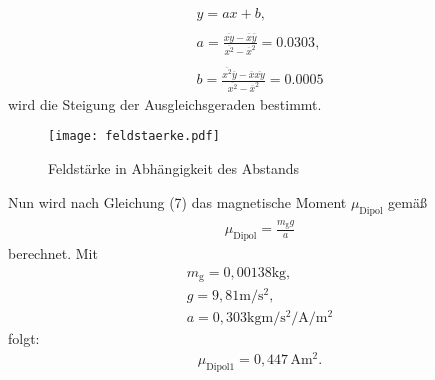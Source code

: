 \begin{gather*}
y = ax+b, \\~\\
a = \frac{\overline{xy}-\overline x\overline y}{\overline{x^2}-\overline{x}^2} = 0.0303,\\~\\
b = \frac{\overline{x^2}\overline{y}-\overline{x}\overline{xy}}{\overline{x^2}-\overline{x}^2} = 0.0005
\end{gather*}
wird die Steigung der Ausgleichsgeraden bestimmt.

\begin{figure}
  \center
  \texttt{[image: feldstaerke.pdf]}
  \caption{Feldstärke in Abhängigkeit des Abstands}
  \label{fig:feldstaerke}
\end{figure}

Nun wird nach Gleichung (7) das magnetische Moment $\mu_\text{Dipol}$ gemäß
\begin{gather}
\mu_\text{Dipol} = \frac{m_\text{g}g}{a}
\end{gather}
berechnet.
Mit
\begin{gather*}
m_\text{g} = 0,00138 \si{\kilo\gram}, \\
g = 9,81 \si{\meter\per\second\squared}, \\
a = 0,303 \si{\kilo\gram\meter\per\second\squared\per\ampere\per\meter\squared}
\end{gather*}
folgt:
\begin{gather*}
\mu_\text{Dipol1} = 0,447 \,\si{\ampere\meter\squared}.
\end{gather*}

